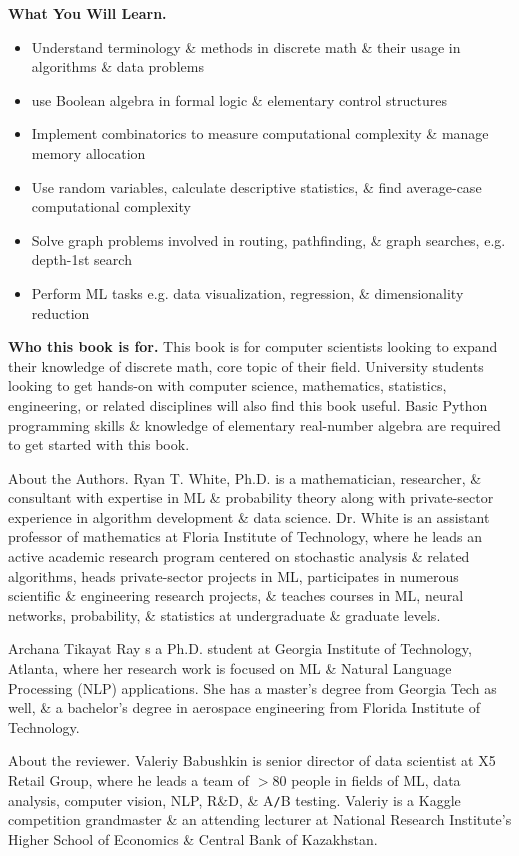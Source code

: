 \documentclass{article}
\begin{document}
\begin{enumerate}
	{\bf What You Will Learn.}
	\begin{itemize}
		\item Understand terminology \& methods in discrete math \& their usage in algorithms \& data problems
		\item use Boolean algebra in formal logic \& elementary control structures
		\item Implement combinatorics to measure computational complexity \& manage memory allocation
		\item Use random variables, calculate descriptive statistics, \& find average-case computational complexity
		\item Solve graph problems involved in routing, pathfinding, \& graph searches, e.g. depth-1st search
		\item Perform ML tasks e.g. data visualization, regression, \& dimensionality reduction
	\end{itemize}
	{\bf Who this book is for.} This book is for computer scientists looking to expand their knowledge of discrete math, core topic of their field. University students looking to get hands-on with computer science, mathematics, statistics, engineering, or related disciplines will also find this book useful. Basic Python programming skills \& knowledge of elementary real-number algebra are required to get started with this book.
	
	{\sf About the Authors.} {\sc Ryan T. White}, Ph.D. is a mathematician, researcher, \& consultant with expertise in ML \& probability theory along with private-sector experience in algorithm development \& data science. Dr. {\sc White} is an assistant professor of mathematics at Floria Institute of Technology, where he leads an active academic research program centered on stochastic analysis \& related algorithms, heads private-sector projects in ML, participates in numerous scientific \& engineering research projects, \& teaches courses in ML, neural networks, probability, \& statistics at undergraduate \& graduate levels.
	
	{\sf Archana Tikayat Ray} s a Ph.D. student at Georgia Institute of Technology, Atlanta, where her research work is focused on ML \& Natural Language Processing (NLP) applications. She has a master's degree from Georgia Tech as well, \& a bachelor's degree in aerospace engineering from Florida Institute of Technology.
	
	{\sf About the reviewer.} {\sc Valeriy Babushkin} is senior director of data scientist at X5 Retail Group, where he leads a team of $> 80$ people in fields of ML, data analysis, computer vision, NLP, R\&D, \& A{\tt/}B testing. {\sc Valeriy} is a Kaggle competition grandmaster \& an attending lecturer at National Research Institute's Higher School of Economics \& Central Bank of Kazakhstan.
	

\end{enumerate}
\end{document}
